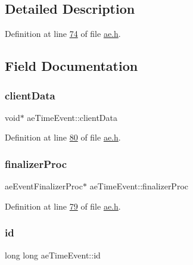 \subsection{Detailed Description}


Definition at line \hyperlink{ae_8h_source_l00074}{74} of file \hyperlink{ae_8h_source}{ae.\+h}.



\subsection{Field Documentation}
\mbox{\label{structaeTimeEvent_ad31bed95bafc0baa81fe645f56a11503}} 
\subsubsection{\texorpdfstring{client\+Data}{clientData}}
{\footnotesize\ttfamily void$\ast$ ae\+Time\+Event\+::client\+Data}



Definition at line \hyperlink{ae_8h_source_l00080}{80} of file \hyperlink{ae_8h_source}{ae.\+h}.

\mbox{\label{structaeTimeEvent_abc682a846c909d98ed1656170bb360f2}} 
\subsubsection{\texorpdfstring{finalizer\+Proc}{finalizerProc}}
{\footnotesize\ttfamily ae\+Event\+Finalizer\+Proc$\ast$ ae\+Time\+Event\+::finalizer\+Proc}



Definition at line \hyperlink{ae_8h_source_l00079}{79} of file \hyperlink{ae_8h_source}{ae.\+h}.

\mbox{\label{structaeTimeEvent_a24ed4bf76ef40a2c735e9f9cccb45de4}} 
\subsubsection{\texorpdfstring{id}{id}}
{\footnotesize\ttfamily long long ae\+Time\+Event\+::id}



